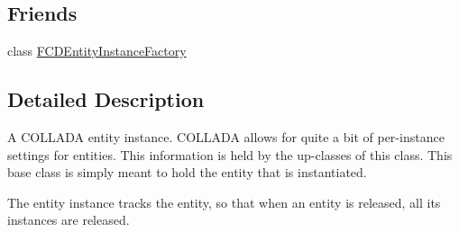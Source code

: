\subsection*{Friends}
\begin{DoxyCompactItemize}
\item 
\hypertarget{classFCDEntityInstance_a069ebb98497ccbc5fdcb75ecfa8b15f7}{
class \hyperlink{classFCDEntityInstance_a069ebb98497ccbc5fdcb75ecfa8b15f7}{FCDEntityInstanceFactory}}
\label{classFCDEntityInstance_a069ebb98497ccbc5fdcb75ecfa8b15f7}

\end{DoxyCompactItemize}


\subsection{Detailed Description}
A COLLADA entity instance. COLLADA allows for quite a bit of per-\/instance settings for entities. This information is held by the up-\/classes of this class. This base class is simply meant to hold the entity that is instantiated.

The entity instance tracks the entity, so that when an entity is released, all its instances are released. 

